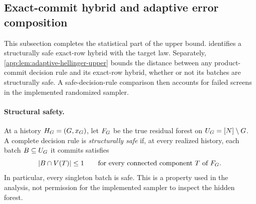 \subsection{Exact-commit hybrid and adaptive error composition}
\label{app:upper-proof-error}

This subsection completes the statistical part of the upper bound.
 identifies a structurally safe exact-row hybrid
with the target law.  Separately,
\cref{app:lem:adaptive-hellinger-upper} bounds the distance between any
product-commit decision rule and its exact-row hybrid, whether or not its
batches are structurally safe.  A safe-decision-rule comparison then accounts
for failed screens in the implemented randomized sampler.


\paragraph{Structural safety.}
At a history $H_{G}=(G,x_G)$, let $F_{G}$ be the true residual
forest on $U_{G}=[N]\setminus G$.
A complete decision rule is \emph{structurally safe} if, at every realized
history, each batch $B\subseteq U_{G}$ it commits satisfies
\[
 |B\cap V(T)|\le1
 \qquad\text{for every connected component }T\text{ of }F_{G}.
\]
In particular, every singleton batch is safe.
This is a property used in the analysis, not permission for the implemented
sampler to inspect the hidden forest.

